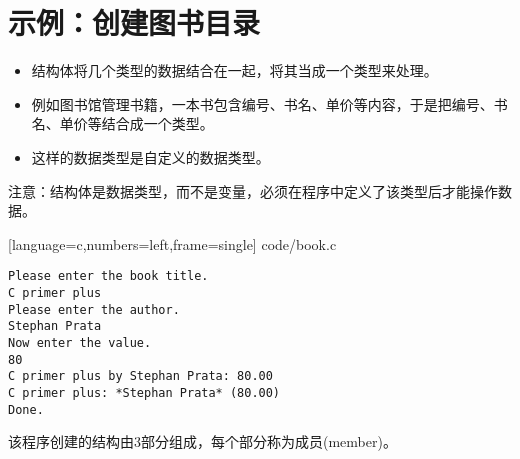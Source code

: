 \section{示例：创建图书目录}

\begin{frame}[fragile]\ft{\secname}
  \begin{itemize}
  \item  结构体将几个类型的数据结合在一起，将其当成一个类型来处理。
  \item[] 例如图书馆管理书籍，一本书包含编号、书名、单价等内容，于是把编号、书名、单价等结合成一个类型。
  \item 这样的数据类型是自定义的数据类型。
  \end{itemize}

注意：结构体是数据类型，而不是变量，必须在程序中定义了该类型后才能操作数据。
\end{frame}


\begin{frame}\ft{\secname}

[language=c,numbers=left,frame=single]
{code/book.c}
\end{frame}

\begin{frame}[fragile]\ft{\secname}
  \begin{lstlisting}[backgroundcolor=\color{blue!20}]
Please enter the book title.
C primer plus
Please enter the author.
Stephan Prata
Now enter the value.
80
C primer plus by Stephan Prata: 80.00
C primer plus: *Stephan Prata* (80.00)
Done.    
  \end{lstlisting}
\end{frame}

\begin{frame}[fragile]\ft{\secname}
该程序创建的结构由3部分组成，每个部分称为成员{\tf (member)}。
\end{frame}

